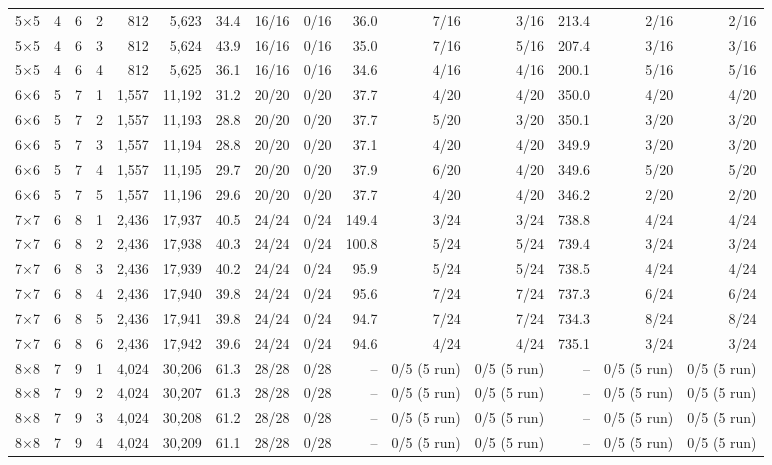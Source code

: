 \documentclass[10pt]{article}
\begin{document}
\begin{lrbox}{\tbl}
\begin{tabular}{rrrrrrrrrrrrrrr}
5$\times$5 & 4 & 6 & 2 & 812 & 5,623 & 34.4 & 16/16 & 0/16 & 36.0 & 7/16 & 3/16 & 213.4 & 2/16 & 2/16 \\
5$\times$5 & 4 & 6 & 3 & 812 & 5,624 & 43.9 & 16/16 & 0/16 & 35.0 & 7/16 & 5/16 & 207.4 & 3/16 & 3/16 \\
5$\times$5 & 4 & 6 & 4 & 812 & 5,625 & 36.1 & 16/16 & 0/16 & 34.6 & 4/16 & 4/16 & 200.1 & 5/16 & 5/16 \\
6$\times$6 & 5 & 7 & 1 & 1,557 & 11,192 & 31.2 & 20/20 & 0/20 & 37.7 & 4/20 & 4/20 & 350.0 & 4/20 & 4/20 \\
6$\times$6 & 5 & 7 & 2 & 1,557 & 11,193 & 28.8 & 20/20 & 0/20 & 37.7 & 5/20 & 3/20 & 350.1 & 3/20 & 3/20 \\
6$\times$6 & 5 & 7 & 3 & 1,557 & 11,194 & 28.8 & 20/20 & 0/20 & 37.1 & 4/20 & 4/20 & 349.9 & 3/20 & 3/20 \\
6$\times$6 & 5 & 7 & 4 & 1,557 & 11,195 & 29.7 & 20/20 & 0/20 & 37.9 & 6/20 & 4/20 & 349.6 & 5/20 & 5/20 \\
6$\times$6 & 5 & 7 & 5 & 1,557 & 11,196 & 29.6 & 20/20 & 0/20 & 37.7 & 4/20 & 4/20 & 346.2 & 2/20 & 2/20 \\
7$\times$7 & 6 & 8 & 1 & 2,436 & 17,937 & 40.5 & 24/24 & 0/24 & 149.4 & 3/24 & 3/24 & 738.8 & 4/24 & 4/24 \\
7$\times$7 & 6 & 8 & 2 & 2,436 & 17,938 & 40.3 & 24/24 & 0/24 & 100.8 & 5/24 & 5/24 & 739.4 & 3/24 & 3/24 \\
7$\times$7 & 6 & 8 & 3 & 2,436 & 17,939 & 40.2 & 24/24 & 0/24 & 95.9 & 5/24 & 5/24 & 738.5 & 4/24 & 4/24 \\
7$\times$7 & 6 & 8 & 4 & 2,436 & 17,940 & 39.8 & 24/24 & 0/24 & 95.6 & 7/24 & 7/24 & 737.3 & 6/24 & 6/24 \\
7$\times$7 & 6 & 8 & 5 & 2,436 & 17,941 & 39.8 & 24/24 & 0/24 & 94.7 & 7/24 & 7/24 & 734.3 & 8/24 & 8/24 \\
7$\times$7 & 6 & 8 & 6 & 2,436 & 17,942 & 39.6 & 24/24 & 0/24 & 94.6 & 4/24 & 4/24 & 735.1 & 3/24 & 3/24 \\
8$\times$8 & 7 & 9 & 1 & 4,024 & 30,206 & 61.3 & 28/28 & 0/28 & -- & 0/5 (5 run) & 0/5 (5 run) & -- & 0/5 (5 run) & 0/5 (5 run) \\
8$\times$8 & 7 & 9 & 2 & 4,024 & 30,207 & 61.3 & 28/28 & 0/28 & -- & 0/5 (5 run) & 0/5 (5 run) & -- & 0/5 (5 run) & 0/5 (5 run) \\
8$\times$8 & 7 & 9 & 3 & 4,024 & 30,208 & 61.2 & 28/28 & 0/28 & -- & 0/5 (5 run) & 0/5 (5 run) & -- & 0/5 (5 run) & 0/5 (5 run) \\
8$\times$8 & 7 & 9 & 4 & 4,024 & 30,209 & 61.1 & 28/28 & 0/28 & -- & 0/5 (5 run) & 0/5 (5 run) & -- & 0/5 (5 run) & 0/5 (5 run) \\

\end{tabular}
\end{lrbox}
\end{document}
